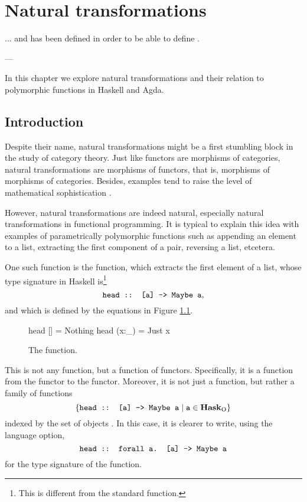 \chapter{Natural transformations}
\label{chap:naturals}

\epigraph{
  ... and  has been defined in order to be able to
  define .
}{---\textcite[18]{maclane-1998}}

In this chapter we explore natural transformations and their relation
to polymorphic functions in Haskell and Agda.

\section{Introduction}
\label{sec:naturals-introduction}

Despite their name, natural transformations might be a first stumbling
block in the study of category theory. Just like functors are
morphisms of categories, natural transformations are morphisms of
functors, that is, morphisms of morphisms of categories. Besides,
examples tend to raise the level of mathematical sophistication
\parencites[433]{poigne-1992}[page 47]{rydeheard-1988}.

However, natural transformations are indeed natural, especially
natural transformations in functional programming. It is typical to
explain this idea with examples of parametrically polymorphic
functions such as appending an element to a list, extracting the first
component of a pair, reversing a list, etcetera.

One such function is the  function, which extracts
the first element of a list, whose type signature in Haskell
is\footnote{This is different from the standard 
  function.}
\begin{equation*}
  \text{\texttt{head :: [a] -> Maybe a}}
  \text{,}
\end{equation*}
and which is defined by the equations in Figure \ref{fig:head}.
\begin{figure}[htb]
  \begin{codehaskell}
                        head []    = Nothing
                        head (x:_) = Just x
  \end{codehaskell}
  \caption{The  function.}
  \label{fig:head}
\end{figure}
This is not any function, but a function of functors. Specifically, it
is a function from the \texthaskell{[]} functor to the
 functor. Moreover, it is not just a function, but
rather a family of functions
\begin{equation*}
  \{
  \text{\texttt{head :: [a] -> Maybe a}}
    \mid \text{\texttt{a}} \in \mathcal{\mathbf{Hask}}_{\operatorname{O}}
  \}
\end{equation*}
indexed by the set of objects \catO{\hask}. In this case, it is
clearer to write, using the  language
option,
\begin{equation*}
  \text{\texttt{head :: forall a. [a] -> Maybe a}}
\end{equation*}
for the type signature of the function.

